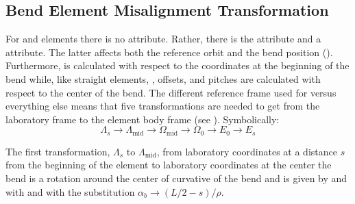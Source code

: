 \subsection{Bend Element Misalignment Transformation}
\label{s:bend.mis}

For  and  elements there is no  attribute.  Rather, there is
the  attribute and a  attribute. The latter affects both the
reference orbit and the bend position (). Furthermore, 
is calculated with respect to the coordinates at the beginning of the bend while, like
straight elements, , offsets, and pitches are calculated with respect to the
center of the bend. The different reference frame used for  versus everything
else means that five transformations are needed to get from the laboratory frame to the
element body frame (see ). Symbolically:
\begin{equation}
  \Lambda_s \longrightarrow \Lambda_\text{mid} 
  \longrightarrow \Omega_\text{mid} \longrightarrow \Omega_0
  \longrightarrow E_0 \longrightarrow E_s
\end{equation}

The first transformation, $\Lambda_s$ to $\Lambda_\text{mid}$, from laboratory coordinates
at a distance $s$ from the beginning of the element to laboratory coordinates at the center the
bend is a rotation around the center of curvative of the bend and is given by 
and  with  and  with the substitution $\alpha_b \rightarrow (L/2
- s)/\rho$.

